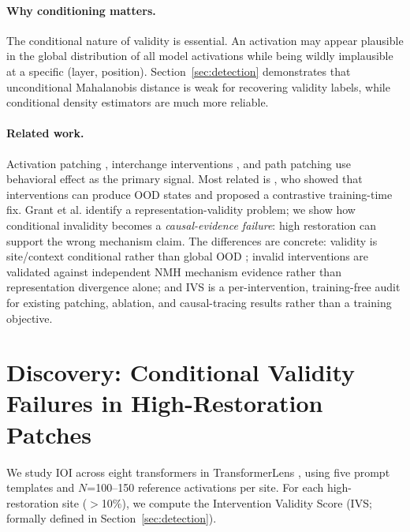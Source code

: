 \documentclass{article}
\begin{document}
\paragraph{Why conditioning matters.}
The conditional nature of validity is essential. An activation may appear plausible in the global distribution of all model activations while being wildly implausible at a specific (layer, position). Section~\ref{sec:detection} demonstrates that unconditional Mahalanobis distance is weak for recovering validity labels, while conditional density estimators are much more reliable.

\paragraph{Related work.}
Activation patching \citep{vig2020investigating,meng2022locating}, interchange interventions \citep{geiger2024finding}, and path patching \citep{wang2022interpretability} use behavioral effect as the primary signal. Most related is \citet{grant2026addressing}, who showed that interventions can produce OOD states and proposed a contrastive training-time fix. Grant et al. identify a representation-validity problem; we show how conditional invalidity becomes a \emph{causal-evidence failure}: high restoration can support the wrong mechanism claim. The differences are concrete: validity is site/context conditional rather than global OOD \citep{lee2018simple}; invalid interventions are validated against independent NMH mechanism evidence rather than representation divergence alone; and IVS is a per-intervention, training-free audit for existing patching, ablation, and causal-tracing results rather than a training objective.

\section{Discovery: Conditional Validity Failures in High-Restoration Patches}
\label{sec:discovery}

We study IOI \citep{wang2022interpretability} across eight transformers in TransformerLens \citep{nanda2022transformerlens}, using five prompt templates and $N$=100--150 reference activations per site. For each high-restoration site ($>$10\%), we compute the Intervention Validity Score (IVS; formally defined in Section~\ref{sec:detection}).
\end{document}
